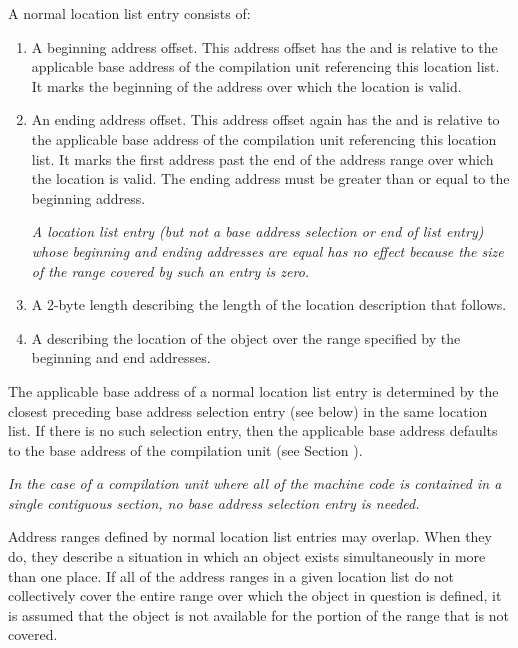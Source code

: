 A 
normal location list entry consists of:
\begin{enumerate}[1. ]
\item A beginning address offset. 
This address offset has the  and is
relative to the applicable base address of the compilation
unit referencing this location list. It marks the beginning
of the address 
over which the location is valid.

\item An ending address offset.  This address offset again
has the  and is relative to the applicable
base address of the compilation unit referencing this location
list. It marks the first address past the end of the address
range over which the location is valid. The ending address
must be greater than or equal to the beginning address.

\textit{A location list entry (but not a base address selection or 
end of list entry) whose beginning
and ending addresses are equal has no effect 
because the size of the range covered by such
an entry is zero.}

\item A 2-byte length describing the length of the location 
description that follows.

\item A  
describing the location of the object over the range specified by
the beginning and end addresses.
\end{enumerate}

The applicable base address of a normal
location list entry is
determined by the closest preceding base address selection
entry (see below) in the same location list. If there is
no such selection entry, then the applicable base address
defaults to the base address of the compilation unit (see
Section ).  

\textit{In the case of a compilation unit where all of
the machine code is contained in a single contiguous section,
no base address selection entry is needed.}

Address ranges defined by normal location list entries
may overlap. When they do, they describe a
situation in which an object exists simultaneously in more than
one place. If all of the address ranges in a given location
list do not collectively cover the entire range over which the
object in question is defined, it is assumed that the object is
not available for the portion of the range that is not covered.

